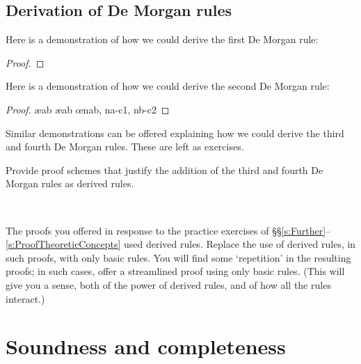 \section{Derivation of De Morgan rules}
Here is a demonstration of how we could derive the first De Morgan rule:
 	\begin{proof}
		\open
			\open
			\close
		\close
		\open
		\close
	\end{proof}
Here is a demonstration of how we could derive the second De Morgan rule:
 	\begin{proof}
		\open
			\ae{ab}
			\ae{ab}
			\open
			\close
			\open
			\close
			\oe{nab, na-c1, nb-c2}
		\close
	\end{proof}
Similar demonstrations can be offered explaining how we could derive the third and fourth De Morgan rules. These are left as exercises.

\practiceproblems

\problempart
Provide proof schemes that justify the addition of the third and fourth De Morgan rules as derived rules. 

\

\problempart
The proofs you offered in response to the practice exercises of \S\S\ref{s:Further}--\ref{s:ProofTheoreticConcepts} used derived rules. Replace the use of derived rules, in such proofs, with only basic rules. You will find some `repetition' in the resulting proofs; in such cases, offer a streamlined proof using only basic rules.  (This will give you a sense, both of the power of derived rules, and of how all the rules interact.)

\chapter{Soundness and completeness}
\label{sec:soundness_and_completeness}

